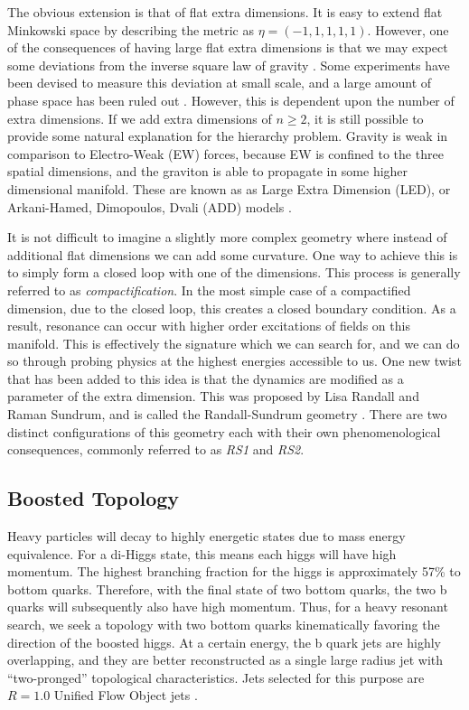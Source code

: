 \documentclass[12pt]{article}
\begin{document}
The obvious extension is that of flat extra dimensions. It is easy to extend
flat Minkowski space by describing the metric as $\eta = (-1,1,1,1,1)$. However,
one of the consequences of having large flat extra dimensions is that we may
expect some deviations from the inverse square law of gravity \cite{}. Some
experiments have been devised to measure this deviation at small scale, and a
large amount of phase space has been ruled out \cite{bsm}. However, this is
dependent upon the number of extra dimensions. If we add extra dimensions of
$n\geq 2$, it is still possible to provide some natural explanation for the
hierarchy problem. Gravity is weak in comparison to Electro-Weak (EW) forces,
because EW is confined to the three spatial dimensions, and the graviton is able
to propagate in some higher dimensional manifold. These are known as as Large
Extra Dimension (LED), or Arkani-Hamed, Dimopoulos, Dvali (ADD) models
\cite{Arkani_Hamed_1998, Arkani_Hamed_1999}. 

It is not difficult to imagine a slightly more complex geometry where instead of
additional flat dimensions we can add some curvature. One way to achieve this is
to simply form a closed loop with one of the dimensions. This process is
generally referred to as \textit{compactification}. In the most simple case of a
compactified dimension, due to the closed loop, this creates a closed boundary
condition. As a result, resonance can occur with higher order excitations of
fields on this manifold. This is effectively the signature which we can search
for, and we can do so through probing physics at the highest energies accessible
to us. One new twist that has been added to this idea is that the dynamics are
modified as a parameter of the extra dimension. This was proposed by Lisa
Randall and Raman Sundrum, and is called the Randall-Sundrum geometry
\cite{RandallSundrumOriginal, bsm}. There are two distinct configurations of
this geometry each with their own phenomenological consequences, commonly
referred to as \textit{RS1} and \textit{RS2}.


\subsection{Boosted Topology}
Heavy particles will decay to highly energetic states due to mass energy
equivalence. For a di-Higgs state, this means each higgs will have high
momentum. The highest branching fraction for the higgs is approximately 57\% to
bottom quarks. Therefore, with the final state of two bottom quarks, the two b
quarks will subsequently also have high momentum. Thus, for a heavy resonant
search, we seek a topology with two bottom quarks kinematically favoring the
direction of the boosted higgs. At a certain energy, the b quark jets are highly
overlapping, and they are better reconstructed as a single large radius jet with
``two-pronged'' topological characteristics. Jets selected for this purpose are
$R=1.0$ Unified Flow Object jets \cite{boosted_hbbcc_tagger, large_r_jet}. 
\end{document}
